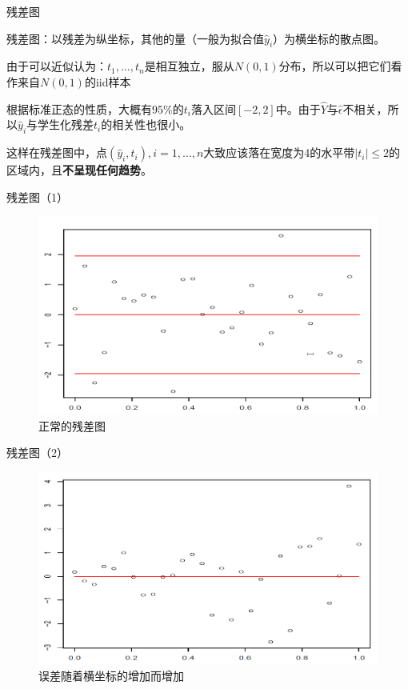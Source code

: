 \documentclass[ignorenonframetext,]{beamer}
\begin{document}
\begin{frame}{残差图}

残差图：以残差为纵坐标，其他的量（一般为拟合值\(\hat y_i\)）为横坐标的散点图。

由于可以近似认为：\(t_1,\dots,t_n\)是相互独立，服从\(N(0,1)\)分布，所以可以把它们看作来自\(N(0,1)\)的iid样本

根据标准正态的性质，大概有\(95\%\)的\(t_i\)落入区间\([-2,2]\)中。由于\(\hat Y\)与\(\hat\epsilon\)不相关，所以\(\hat y_i\)与学生化残差\(t_i\)的相关性也很小。

这样在残差图中，点\((\hat y_i,t_i),i=1,\dots,n\)大致应该落在宽度为4的水平带\(|t_i|\le 2\)的区域内，且\textbf{不呈现任何趋势}。

\end{frame}

\begin{frame}{残差图（1）}
\protect\hypertarget{1}{}

\begin{figure}
\includegraphics[width=0.9\linewidth]{error1} \caption{正常的残差图}\label{fig:unnamed-chunk-14}
\end{figure}

\end{frame}

\begin{frame}{残差图（2）}
\protect\hypertarget{2}{}

\begin{figure}
\includegraphics[width=0.9\linewidth]{error2} \caption{误差随着横坐标的增加而增加}\label{fig:unnamed-chunk-15}
\end{figure}

\end{frame}
\end{document}
